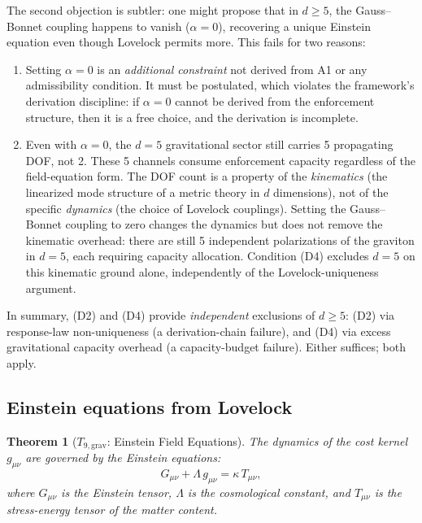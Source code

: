 \documentclass[11pt,a4paper]{article}
\newtheorem{theorem}{Theorem}[section]
\theoremstyle{definition}
\begin{document}
The second objection is subtler: one might propose that in $d \ge 5$,
the Gauss--Bonnet coupling happens to vanish ($\alpha = 0$), recovering
a unique Einstein equation even though Lovelock permits more.  This
fails for two reasons:
\begin{enumerate}[label=(\alph*),nosep]
  \item Setting $\alpha = 0$ is an \emph{additional constraint} not
  derived from A1 or any admissibility condition.  It must be
  postulated, which violates the framework's derivation discipline: if
  $\alpha = 0$ cannot be derived from the enforcement structure, then
  it is a free choice, and the derivation is incomplete.
  \item Even with $\alpha = 0$, the $d = 5$ gravitational sector still
  carries 5 propagating DOF, not 2.  These 5 channels consume
  enforcement capacity regardless of the field-equation form.  The DOF
  count is a property of the \emph{kinematics} (the linearized mode
  structure of a metric theory in $d$ dimensions), not of the specific
  \emph{dynamics} (the choice of Lovelock couplings).  Setting the
  Gauss--Bonnet coupling to zero changes the dynamics but does not
  remove the kinematic overhead: there are still 5 independent
  polarizations of the graviton in $d = 5$, each requiring capacity
  allocation.  Condition (D4) excludes $d = 5$ on this kinematic
  ground alone, independently of the Lovelock-uniqueness argument.
\end{enumerate}
In summary, (D2) and (D4) provide \emph{independent} exclusions of
$d \ge 5$: (D2) via response-law non-uniqueness (a derivation-chain
failure), and (D4) via excess gravitational capacity overhead (a
capacity-budget failure).  Either suffices; both apply.


\subsection{Einstein equations from Lovelock}
\label{sec:einstein}

\begin{theorem}[$T_{9,\mathrm{grav}}$: Einstein Field Equations]\label{thm:einstein}
The dynamics of the cost kernel $g_{\mu\nu}$ are governed by the
Einstein equations:
\[
  G_{\mu\nu} + \Lambda\, g_{\mu\nu} = \kappa\, T_{\mu\nu},
\]
where $G_{\mu\nu}$ is the Einstein tensor, $\Lambda$ is the
cosmological constant, and $T_{\mu\nu}$ is the stress-energy tensor of
the matter content.
\end{theorem}
\end{document}
